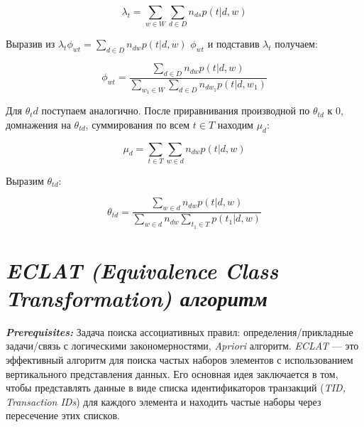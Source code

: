 $$\lambda_{t} = \sum_{w \in W} \sum_{d \in D} n_{ds} p(t|d,w)$$

Выразив из $\lambda_t \phi_{wt} = \sum_{d \in D} n_{dw} p(t|d,w)$ $\phi_{wt}$ и подставив $\lambda_{t}$ получаем:

$$\phi_{wt} = \frac{\sum_{d \in D} n_{dw} p(t|d,w)}{\sum_{w_{1} \in W} \sum_{d \in D} n_{dw_{1}} p(t|d,w_{1})}$$

Для $\theta_td$ поступаем аналогично. После приравнивания производной по $\theta_{td}$ к $0$, домнажения на $\theta_{td}$, суммирования по всем $t \in T$ находим $\mu_{d}$:

$$\mu_{d} = \sum_{t \in T} \sum_{w \in d} n_{dw} p(t|d,w)$$

Выразим $\theta_{td}$:

$$\theta_{td} = \frac{\sum_{w \in d} n_{dw} p(t|d,w)}{\sum_{w \in d} n_{dw} \sum_{t_{1} \in T} p(t_{1}|d,w)}$$


\section{\textbf{\textit{ECLAT (Equivalence Class Transformation) алгоритм}}}
\textbf{\textit{Prerequisites:}} Задача поиска ассоциативных правил: определения/прикладные задачи/связь с логическими закономерностями, \textit{Apriori} алгоритм.\newline\newline
\textit{ECLAT} — это эффективный алгоритм для поиска частых наборов элементов с использованием вертикального представления данных. Его основная идея заключается в том, чтобы представлять данные в виде списка идентификаторов транзакций (\textit{TID, Transaction IDs}) для каждого элемента и находить частые наборы через пересечение этих списков.

